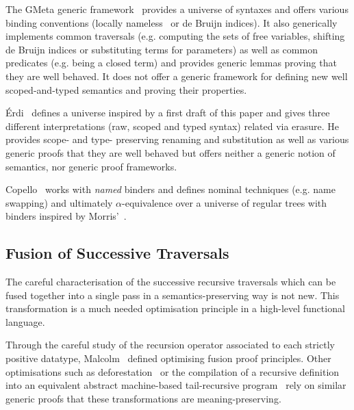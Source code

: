 {The GMeta generic framework~\citeyear{gmeta} provides a universe of syntaxes
and offers various binding conventions (locally nameless~\cite{Chargueraud2012}
or de Bruijn indices). It also generically implements common traversals (e.g. computing
the sets of free variables,
shifting
de Bruijn indices or substituting terms for parameters) as well as common
predicates (e.g. being a closed term) and provides generic lemmas proving that
they are well behaved. It does not offer a generic framework
for defining new well scoped-and-typed semantics and proving their properties.

Érdi~\citeyear{gergodraft} defines a universe inspired by a first draft of this
paper and gives three different interpretations (raw, scoped and typed syntax)
related via erasure. He provides scope- and type- preserving renaming and
substitution as well as various generic proofs that they are well behaved but
offers neither a generic notion of semantics, nor generic proof frameworks.

Copello~\citeyear{copello2017} works with \emph{named} binders and
defines nominal techniques (e.g. name swapping) and ultimately $\alpha$-equivalence
over a universe of regular trees with binders inspired by Morris'~\citeyear{morris-regulartt}.

\subsection{Fusion of Successive Traversals}

The careful characterisation of the successive recursive traversals which can be
fused together into a single pass in a semantics-preserving way is not new. This
transformation is a much needed optimisation principle in a high-level functional
language.

Through the careful study of the recursion operator associated to each
strictly positive datatype,
Malcolm~\citeyear{DBLP:journals/scp/Malcolm90} defined optimising
fusion proof principles.
%
Other optimisations such as deforestation~\cite{DBLP:journals/tcs/Wadler90}
or the compilation of a recursive definition into an equivalent abstract
machine-based tail-recursive program~\cite{DBLP:conf/icfp/CortinasS18}
rely on similar generic proofs that these transformations are meaning-preserving.




}

